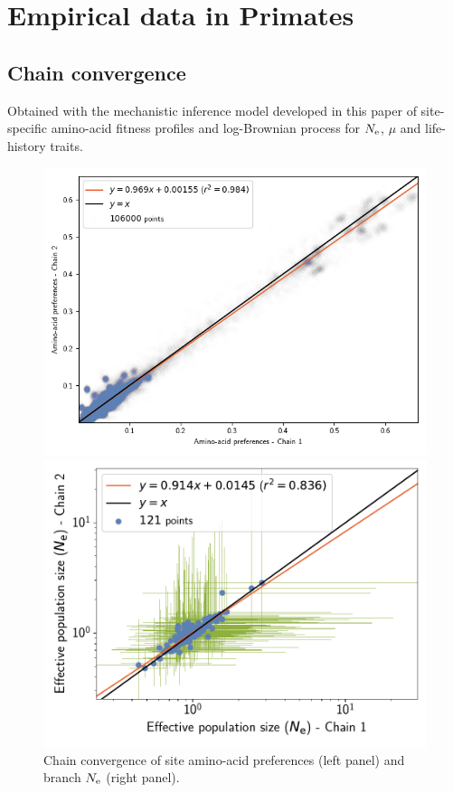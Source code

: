 \documentclass{article}
\begin{document}
	\section{Empirical data in Primates}
	\label{sec:empirical-data-in-primates}

	\subsection{Chain convergence}
	Obtained with the mechanistic inference model developed in this paper of site-specific amino-acid fitness profiles and log-Brownian process for $\Ne$, $\mu$ and life-history traits.

	\begin{figure}[H]
		\centering
		\begin{minipage}{0.49\linewidth}
			\includegraphics[width=\linewidth, page=1]{primates/SiteMutSelBranchNe_ProfileCorrelation.png}
		\end{minipage} \hfill
		\begin{minipage}{0.49\linewidth}
			\includegraphics[width=\linewidth, page=1]{primates/SiteMutSelBranchNe_LogPopulationSizeCorrelation}
		\end{minipage}
		\caption[Chain convergence of site profiles and branche $\Ne$]{
		Chain convergence of site amino-acid preferences (left panel) and branch $\Ne$ (right panel).}
	\end{figure}
\end{document}
